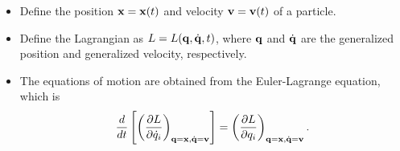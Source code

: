 \documentclass[oneside,a4paper,11pt]{report}
\newcommand{\qvecdot}{\dot{\qvec}}
\newcommand{\qdot}{\dot{q}}
\begin{document}
\begin{itemize}
\item Define the position $\mathbf{x} = \mathbf{x}(t)$ and velocity $\mathbf{v} = \mathbf{v}(t)$ of a particle. 

\item Define the Lagrangian as $L = L(\qvec, \qvecdot,t)$, where $\mathbf{q}$ and $\qvecdot$ are the generalized position and generalized velocity, respectively. 

\item The equations of motion are obtained from the Euler-Lagrange equation, which is 
\begin{equation}
\frac{d}{dt} \left [ \left ( \frac{\partial L}{\partial \qdot_i } \right )_{\qvec =  \xvec, \qvecdot = \vvec }  \right] = \left ( \frac{\partial L}{\partial q_i} \right )_{ \qvec =  \xvec, \qvecdot = \vvec} .
\end{equation}


\end{itemize}
\end{document}
